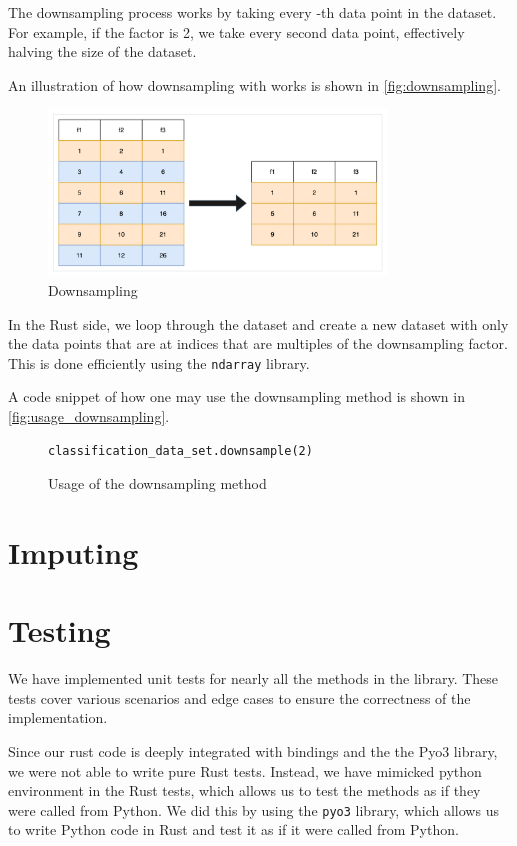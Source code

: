 \documentclass[review]{AIM_report}
\begin{document}
The downsampling process works by taking every \factor-th data point in the dataset. For example, if the factor is 2, we take every second data point, effectively halving the size of the dataset.

An illustration of how downsampling with  works is shown in \autoref{fig:downsampling}.
\begin{figure}
    \centering
    \includegraphics[width=0.8\textwidth]{files/downsampling/downsampling.png}
    \caption{Downsampling}
    \label{fig:downsampling}
\end{figure}

In the Rust side, we loop through the dataset and create a new dataset with only the data points that are at indices that are multiples of the downsampling factor. This is done efficiently using the \texttt{ndarray} library.

A code snippet of how one may use the downsampling method is shown in \autoref{fig:usage_downsampling}.
\begin{figure}[H]
    \begin{lstlisting}[style=python]
classification_data_set.downsample(2)
    \end{lstlisting}
    \caption{Usage of the downsampling method}
    \label{fig:usage_downsampling}
\end{figure}

\newpage
\section{Imputing}

\newpage
\section{Testing}
We have implemented unit tests for nearly all the methods in the library. These tests cover various scenarios and edge cases to ensure the correctness of the implementation.

Since our rust code is deeply integrated with bindings and the the Pyo3 library, we were not able to write pure Rust tests. Instead, we have mimicked python environment in the Rust tests, which allows us to test the methods as if they were called from Python.
We did this by using the \texttt{pyo3} library, which allows us to write Python code in Rust and test it as if it were called from Python.
\end{document}
